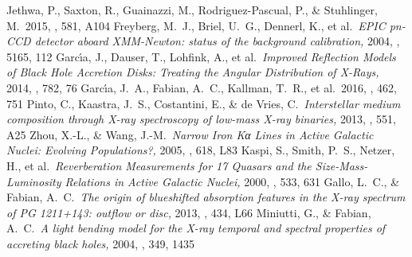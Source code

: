 \documentclass[10pt, a4paper]{article}
\begin{document}
\begin{thebibliography}{1}


\makeatletter
\addtocounter{\@listctr}{24}
\makeatother







 Jethwa, P., Saxton, R., Guainazzi, M., Rodriguez-Pascual, P., \& Stuhlinger, M.\ 2015, \aap, 581, A104 
 Freyberg, M.~J., Briel, U.~G., Dennerl, K., et al.\ \emph{EPIC pn-CCD detector aboard XMM-Newton: status of the background calibration,} 2004, \procspie, 5165, 112 
 Garc{\'{\i}}a, J., Dauser, T., Lohfink, A., et al.\ \emph{Improved Reflection Models of Black Hole Accretion Disks: Treating the Angular Distribution of X-Rays,} 2014, \apj, 782, 76 
 Garc{\'{\i}}a, J.~A., Fabian, A.~C., Kallman, T.~R., et al.\ 2016, \mnras, 462, 751 
 Pinto, C., Kaastra, J.~S., Costantini, E., \& de Vries, C.\ \emph{Interstellar medium composition through X-ray spectroscopy of low-mass X-ray binaries,} 2013, \aap, 551, A25 
 Zhou, X.-L., \& Wang, J.-M.\ \emph{Narrow Iron Kα Lines in Active Galactic Nuclei: Evolving Populations?,} 2005, \apjl, 618, L83 
 Kaspi, S., Smith, P.~S., Netzer, H., et al.\ \emph{Reverberation Measurements for 17 Quasars and the Size-Mass-Luminosity Relations in Active Galactic Nuclei,} 2000, \apj, 533, 631 
 Gallo, L.~C., \& Fabian, A.~C.\ \emph{The origin of blueshifted absorption features in the X-ray spectrum of PG 1211+143: outflow or disc,} 2013, \mnras, 434, L66  
 Miniutti, G., \& Fabian, A.~C.\ \emph{A light bending model for the X-ray temporal and spectral properties of accreting black holes,} 2004, \mnras, 349, 1435 


\end{thebibliography}
 
\end{document}
